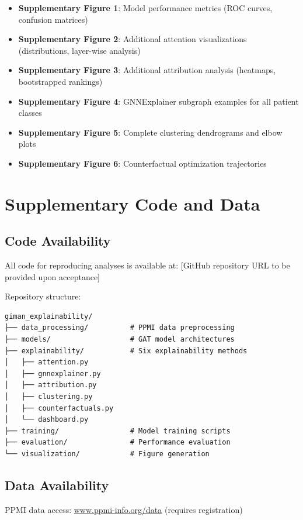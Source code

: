 \documentclass[11pt]{article}
\begin{document}
\begin{itemize}
\item \textbf{Supplementary Figure 1}: Model performance metrics (ROC curves, confusion matrices)
\item \textbf{Supplementary Figure 2}: Additional attention visualizations (distributions, layer-wise analysis)
\item \textbf{Supplementary Figure 3}: Additional attribution analysis (heatmaps, bootstrapped rankings)
\item \textbf{Supplementary Figure 4}: GNNExplainer subgraph examples for all patient classes
\item \textbf{Supplementary Figure 5}: Complete clustering dendrograms and elbow plots
\item \textbf{Supplementary Figure 6}: Counterfactual optimization trajectories
\end{itemize}

\newpage
\section{Supplementary Code and Data}

\subsection{Code Availability}

All code for reproducing analyses is available at: [GitHub repository URL to be provided upon acceptance]

Repository structure:
\begin{verbatim}
giman_explainability/
├── data_processing/          # PPMI data preprocessing
├── models/                   # GAT model architectures
├── explainability/           # Six explainability methods
│   ├── attention.py
│   ├── gnnexplainer.py
│   ├── attribution.py
│   ├── clustering.py
│   ├── counterfactuals.py
│   └── dashboard.py
├── training/                 # Model training scripts
├── evaluation/               # Performance evaluation
└── visualization/            # Figure generation
\end{verbatim}

\subsection{Data Availability}

PPMI data access: \url{www.ppmi-info.org/data} (requires registration)
\end{document}
